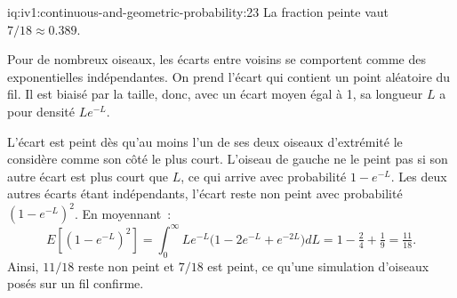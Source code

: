 \begin{solution}{iq:iv1:continuous-and-geometric-probability:23}
La fraction peinte vaut $7/18 \approx 0.389$.

Pour de nombreux oiseaux, les écarts entre voisins se comportent comme des exponentielles indépendantes. On prend l'écart qui contient un point aléatoire du fil. Il est biaisé par la taille, donc, avec un écart moyen égal à 1, sa longueur $L$ a pour densité $Le^{-L}$.

L'écart est peint dès qu'au moins l'un de ses deux oiseaux d'extrémité le considère comme son côté le plus court. L'oiseau de gauche ne le peint pas si son autre écart est plus court que $L$, ce qui arrive avec probabilité $1 - e^{-L}$. Les deux autres écarts étant indépendants, l'écart reste non peint avec probabilité $(1 - e^{-L})^2$. En moyennant~:
\[
E[(1 - e^{-L})^2] = \int_0^\infty Le^{-L}\bigl(1 - 2e^{-L} + e^{-2L}\bigr) dL = 1 - \tfrac24 + \tfrac19 = \tfrac{11}{18}.
\]
Ainsi, $11/18$ reste non peint et $7/18$ est peint, ce qu'une simulation d'oiseaux posés sur un fil confirme.

\end{solution}

